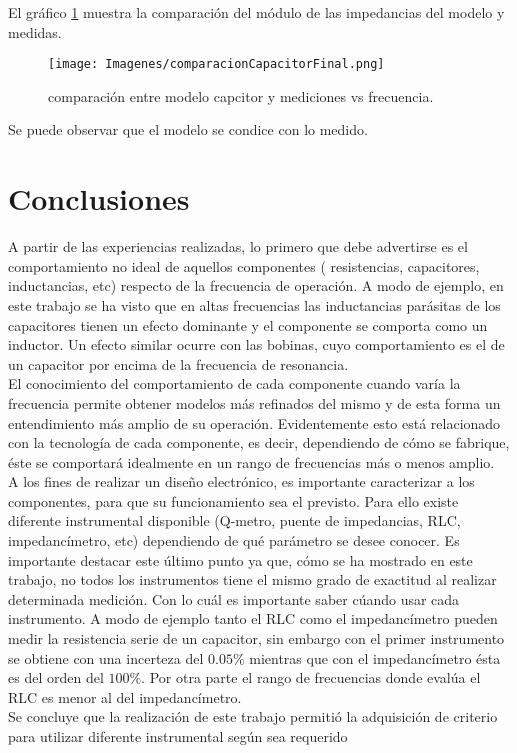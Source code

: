 \documentclass[a4paper,10pt]{article}
\begin{document}
		\indent El gráfico \ref{img:001} muestra la comparación del módulo de 
		las impedancias del modelo y medidas.

		\begin{figure}[!htb]
			\centering
			\texttt{[image: Imagenes/comparacionCapacitorFinal.png]}
			\caption{comparación entre modelo capcitor y mediciones vs 
			frecuencia.}
			\label{img:001} 
		\end{figure}

		\indent Se puede observar que el modelo se condice con lo medido.

\newpage
\section{Conclusiones}
	\indent A partir de las experiencias realizadas, lo primero que debe 
	advertirse es el comportamiento no ideal de aquellos componentes (
	resistencias, capacitores, inductancias, etc) respecto de la frecuencia de 
	operaci\'on. A modo de ejemplo, en este trabajo se ha visto que en altas 
	frecuencias las inductancias par\'asitas de los capacitores tienen un efecto
	dominante y el componente se comporta como un inductor. Un efecto similar 
	ocurre con las bobinas, cuyo comportamiento es el de un capacitor por encima
	de la frecuencia de resonancia. \\
	\indent El conocimiento del comportamiento de cada componente cuando var\'ia
	la frecuencia permite obtener modelos m\'as refinados del mismo y de esta 
	forma un entendimiento m\'as amplio de su operaci\'on. Evidentemente esto 
	est\'a relacionado con la tecnolog\'ia de cada componente, es decir, 
	dependiendo de c\'omo se fabrique, \'este se comportar\'a idealmente en un 
	rango de frecuencias m\'as o menos amplio. \\
	\indent A los fines de realizar un dise\~no electr\'onico, es importante 
	caracterizar a los componentes, para que su funcionamiento sea el previsto. 
	Para ello existe diferente instrumental disponible (Q-metro, puente de 
	impedancias, RLC, impedanc\'imetro, etc) dependiendo de qu\'e par\'ametro se
	desee conocer. Es importante destacar este \'ultimo punto ya que, c\'omo se 
	ha mostrado en este trabajo, no todos los instrumentos tiene el mismo grado 
	de exactitud al realizar determinada medici\'on. Con lo cu\'al es importante
	saber c\'uando usar cada instrumento. A modo de ejemplo tanto el RLC como el
	impedanc\'imetro pueden medir la resistencia serie de un capacitor, sin 
	embargo con el primer instrumento se obtiene con una incerteza del $0.05 \%$
	mientras que con el impedanc\'imetro \'esta es del orden del $100\%$. Por 
	otra parte el rango de frecuencias donde eval\'ua el RLC es menor al del 
	impedanc\'imetro. \\	
	\indent Se concluye que la realizaci\'on de este trabajo permiti\'o la 
	adquisici\'on de criterio para utilizar diferente instrumental seg\'un sea 
	requerido\\
\end{document}
